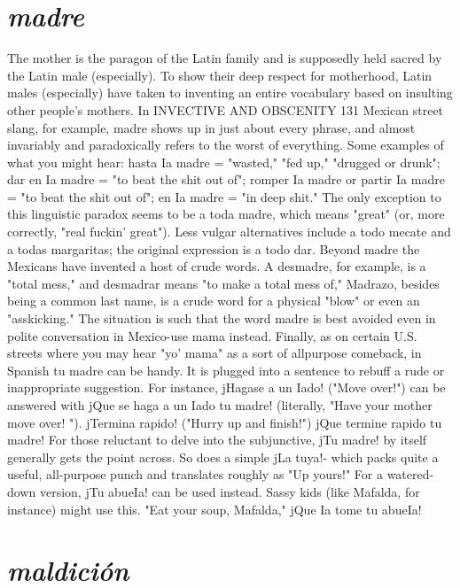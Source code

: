\section{\emph{madre}}

The mother is the paragon of the Latin family and is supposedly held sacred by the Latin male (especially). To show their deep respect for motherhood, Latin males (especially) have taken to inventing an entire vocabulary based on insulting other people's mothers. In
INVECTIVE AND OBSCENITY 131
Mexican street slang, for example, madre shows up in just about every
phrase, and almost invariably and paradoxically refers to the worst of
everything. Some examples of what you might hear: hasta Ia madre =
"wasted," "fed up," "drugged or drunk"; dar en Ia madre = "to beat
the shit out of"; romper Ia madre or partir Ia madre = "to beat the
shit out of"; en Ia madre = "in deep shit." The only exception to this
linguistic paradox seems to be a toda madre, which means "great" (or,
more correctly, "real fuckin' great"). Less vulgar alternatives include
a todo mecate and a todas margaritas; the original expression is a
todo dar.
Beyond madre the Mexicans have invented a host of crude
words. A desmadre, for example, is a "total mess," and desmadrar
means "to make a total mess of," Madrazo, besides being a common
last name, is a crude word for a physical "blow" or even an "asskicking." The situation is such that the word madre is best avoided
even in polite conversation in Mexico-use mama instead. Finally, as
on certain U.S. streets where you may hear "yo' mama" as a sort of allpurpose comeback, in Spanish tu madre can be handy. It is plugged
into a sentence to rebuff a rude or inappropriate suggestion. For instance, jHagase a un Iado! ("Move over!") can be answered with jQue
se haga a un Iado tu madre! (literally, "Have your mother move over! ").
jTermina rapido! ("Hurry up and finish!") jQue termine rapido tu
madre! For those reluctant to delve into the subjunctive, jTu madre!
by itself generally gets the point across. So does a simple jLa tuya!-
which packs quite a useful, all-purpose punch and translates roughly
as "Up yours!" For a watered-down version, jTu abueIa! can be used
instead. Sassy kids (like Mafalda, for instance) might use this. "Eat
your soup, Mafalda," jQue Ia tome tu abueIa!

\section{\emph{maldición}}

